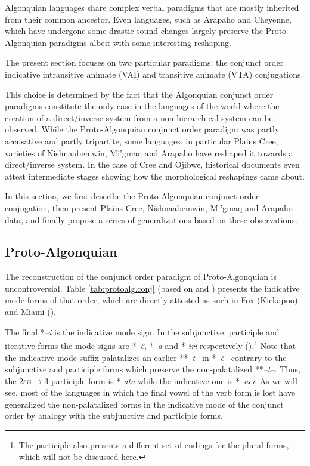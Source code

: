 \documentclass[twoside,a4paper,11pt]{article}
\newcommand{\ipa}[1]{{\phon\textit{#1}}}
\newcommand{\sg}{\textsc{sg}}
\newcommand{\Σ}{\greek{Σ}}
\begin{document}
Algonquian languages share complex verbal paradigms that are mostly inherited from their common ancestor. Even languages, such as Arapaho and Cheyenne, which have undergone some drastic sound changes largely preserve the Proto-Algonquian paradigms albeit with some interesting reshaping.

The present section focuses on two particular paradigms: the conjunct order indicative intransitive animate (VAI) and transitive animate (VTA) conjugations. 

This choice is determined by the fact that the Algonquian conjunct order paradigms constitute the only case in the languages of the world where the creation of a direct/inverse system from a non-hierarchical system can be observed. While the Proto-Algonquian conjunct order paradigm was partly accusative and partly tripartite, some languages, in particular Plains Cree, varieties of Nishnaabemwin, Mi'gmaq and  Arapaho have reshaped it towards a direct/inverse system. In the case of Cree and Ojibwe, historical documents even attest intermediate stages showing how the morphological reshapings came about.

In this section, we first describe the Proto-Algonquian conjunct order conjugation, then present Plains Cree, Nishnaabemwin, Mi'gmaq and Arapaho data, and finally propose a series of generalizations based on these observations.

\subsection{Proto-Algonquian}
The reconstruction of the conjunct order paradigm of Proto-Algonquian is uncontroversial. Table \ref{tab:protoalg.conj} (based on \citealt{bloomfield46proto} and \citealt{goddard00cheyenne}) presents the indicative mode forms of that order, which are directly attested as such in Fox (Kickapoo) and Miami (\citealt{costa03miami}).

The final *\ipa{--i} is the indicative mode sign. In the subjunctive, participle and iterative forms the mode signs are *\ipa{--ê}, *\ipa{--a} and *\ipa{-iri} respectively (\citealt[295]{oxford14microparameters}).\footnote{The participle also presents a different set of endings for the plural forms, which will not be discussed here.} Note that the indicative mode suffix palatalizes an earlier **\ipa{--t--} in *\ipa{--č--} contrary to the subjunctive and participle forms which preserve the non-palatalized **\ipa{--t--}. Thus, the 2\sg$\rightarrow$3 participle form is *\ipa{-ata} while the indicative one is *\ipa{--aci}. As we will see, most of the languages in which the final vowel of the verb form is lost have generalized the non-palatalized forms in the indicative mode of the conjunct order by analogy with the subjunctive and participle forms.
\end{document}
